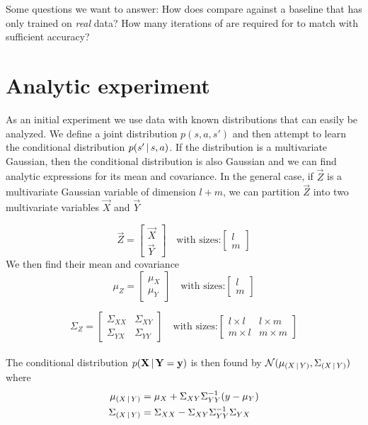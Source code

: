 Some questions we want to answer: How does \dettostoc{} compare against a baseline that has only trained on \emph{real} data? How many iterations of \dettostoc{} are required for \fdecoder{} to match \fsimulator{} with sufficient accuracy?


\section{Analytic experiment}
\label{exp:analytic}
As an initial experiment we use data with known distributions that can easily be analyzed. We define a joint distribution $p(s,a,s')$ and then attempt to learn the conditional distribution $p\given{s'}{s,a}$. If the distribution is a multivariate Gaussian, then the conditional distribution is also Gaussian and we can find analytic expressions for its mean and covariance. In the general case, if $\vec{Z}$ is a multivariate Gaussian variable of dimension $l+m$, we can partition $\vec{Z}$ into two multivariate variables $\vec{X}$ and $\vec{Y}$

\begin{equation}
\vec{Z} = 
\begin{bmatrix}
\vec{X} \\
\vec{Y}
\end{bmatrix}
\quad
\text{with sizes:} 
\begin{bmatrix}
l \\
m
\end{bmatrix}
\end{equation}
We then find their mean and covariance
\begin{equation}
\mu_{Z} = 
\begin{bmatrix}
\mu_{X} \\
\mu_{Y}
\end{bmatrix}
\quad
\text{with sizes:} 
\begin{bmatrix}
l \\
m
\end{bmatrix}
\end{equation}

\begin{equation}
\Sigma_{Z} = 
\begin{bmatrix}
\Sigma_{XX} & \Sigma_{XY} \\
\Sigma_{YX} & \Sigma_{YY}
\end{bmatrix}
\quad
\text{with sizes:} 
\begin{bmatrix}
l\times l & l \times m\\
m \times l & m \times m
\end{bmatrix}
\end{equation}
\\
The conditional distribution $p\given{\mathbf{X}}{\mathbf{Y}=\mathbf{y}}$ is then found by $\mathcal{N} (\mu_{\given{X}{Y}}, \Sigma_{\given{X}{Y}})$ where
\begin{align}
\mu_{\given{X}{Y}} &= \mu_{X} + \Sigma_{XY}\Sigma_{YY}^{-1}(y - \mu_{Y})
\label{eq_cond_mean}
\\
\Sigma_{\given{X}{Y}} &= \Sigma_{XX} - \Sigma_{XY}\Sigma_{YY}^{-1}\Sigma_{YX}
\label{eq_cond_var}
\end{align}

